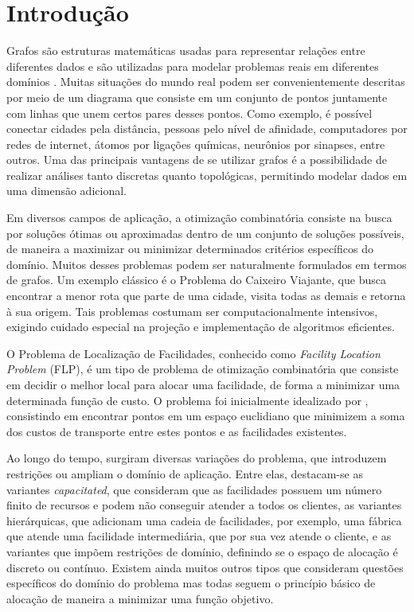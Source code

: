 \chapter{Introdução}

Grafos são estruturas matemáticas usadas para representar relações entre diferentes dados e são utilizadas para modelar problemas reais em diferentes domínios \cite{graph_applications2020}. Muitas situações do mundo real podem ser convenientemente descritas por meio de um diagrama que consiste em um conjunto de pontos juntamente com linhas que unem certos pares desses pontos. Como exemplo, é possível conectar cidades pela distância, pessoas pelo nível de afinidade, computadores por redes de internet, átomos por ligações químicas, neurônios por sinapses, entre outros. Uma das principais vantagens de se utilizar grafos é a possibilidade de realizar análises tanto discretas quanto topológicas, permitindo modelar dados em uma dimensão adicional.

Em diversos campos de aplicação, a otimização combinatória consiste na busca por soluções ótimas ou aproximadas dentro de um conjunto de soluções possíveis, de maneira a maximizar ou minimizar determinados critérios específicos do domínio. Muitos desses problemas podem ser naturalmente formulados em termos de grafos. Um exemplo clássico é o Problema do Caixeiro Viajante, que busca encontrar a menor rota que parte de uma cidade, visita todas as demais e retorna à sua origem. Tais problemas costumam ser computacionalmente intensivos, exigindo cuidado especial na projeção e implementação de algoritmos eficientes.

O Problema de Localização de Facilidades, conhecido como \textit{Facility Location Problem} (FLP), é um tipo de problema de otimização combinatória que consiste em decidir o melhor local para alocar uma facilidade, de forma a minimizar uma determinada função de custo. O problema foi inicialmente idealizado por , consistindo em encontrar pontos em um espaço euclidiano que minimizem a soma dos custos de transporte entre estes pontos e as facilidades existentes.

Ao longo do tempo, surgiram diversas variações do problema, que introduzem restrições ou ampliam o domínio de aplicação. Entre elas, destacam-se as variantes \textit{capacitated}, que consideram que as facilidades possuem um número finito de recursos e podem não conseguir atender a todos os clientes, as variantes hierárquicas, que adicionam uma cadeia de facilidades, por exemplo, uma fábrica que atende uma facilidade intermediária, que por sua vez atende o cliente, e as variantes que impõem restrições de domínio, definindo se o espaço de alocação é discreto ou contínuo. Existem ainda muitos outros tipos que consideram questões específicos do domínio do problema mas todas seguem o princípio básico de alocação de maneira a minimizar uma função objetivo.

